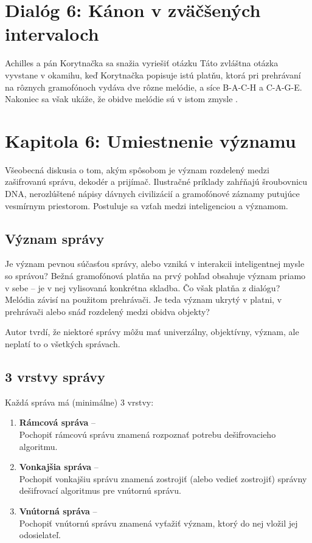 \documentclass[12pt]{article}
\begin{document}
\section*{Dialóg 6: Kánon v zväčšených intervaloch}

Achilles a pán Korytnačka sa snažia vyriešiť otázku  Táto zvláštna otázka vyvstane v okamihu, keď Korytnačka popisuje istú platňu, ktorá pri prehrávaní na rôznych gramofónoch vydáva dve rôzne melódie, a síce B-A-C-H a C-A-G-E. Nakoniec sa však ukáže, že obidve melódie sú v istom zmysle .

\setcounter{section}{5}
\section*{Kapitola 6: Umiestnenie významu}

Všeobecná diskusia o tom, akým spôsobom je význam rozdelený medzi zašifrovanú správu, dekodér a prijímač. Ilustračné príklady zahŕňajú šroubovnicu DNA, nerozlúštené nápisy dávnych civilizácií a gramofónové záznamy putujúce vesmírnym priestorom. Postuluje sa vzťah medzi inteligenciou a  významom.

\subsection{Význam správy}

Je význam pevnou súčasťou správy, alebo vzniká v interakcii inteligentnej mysle so správou? Bežná gramofónová platňa na prvý pohľad obsahuje význam priamo v sebe -- je v nej vylisovaná konkrétna skladba. Čo však platňa z dialógu? Melódia závisí na použitom prehrávači. Je teda význam ukrytý v platni, v prehrávači alebo snáď rozdelený medzi obidva objekty?

Autor tvrdí, že niektoré správy môžu mať univerzálny, objektívny, význam, ale neplatí to o všetkých správach.

\subsection{3 vrstvy správy}

Každá správa má (minimálne) 3 vrstvy:
\begin{enumerate}
\item \textbf{Rámcová správa} -- \\ Pochopiť rámcovú správu znamená rozpoznať potrebu dešifrovacieho algoritmu.
\item \textbf{Vonkajšia správa} -- \\Pochopiť vonkajšiu správu znamená zostrojiť (alebo vedieť zostrojiť) správny dešifrovací algoritmus pre vnútornú správu.
\item \textbf{Vnútorná správa} -- \\Pochopiť vnútornú správu znamená vyťažiť význam, ktorý do nej vložil jej odosielateľ.
\end{enumerate}
\end{document}
